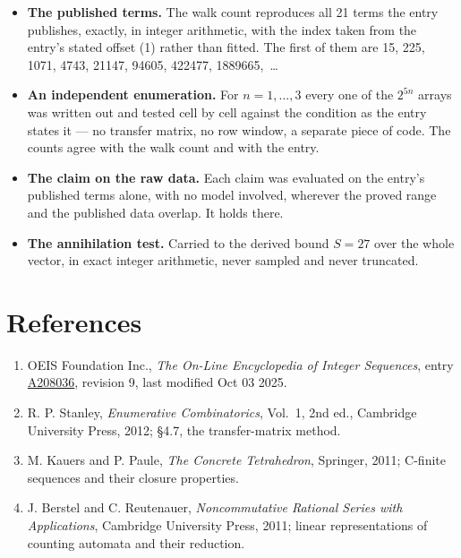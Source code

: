 \documentclass[11pt]{article}
\theoremstyle{definition}
\begin{document}
\begin{itemize}

\item {\bfseries The published terms.} The walk count reproduces all 21 terms the entry publishes, exactly, in integer arithmetic, with the index taken from the entry's stated offset (1) rather than fitted. The first of them are 15, 225, 1071, 4743, 21147, 94605, 422477, 1889665,~\dots

\item {\bfseries An independent enumeration.} For $n = 1,\dots,3$ every one of the $2^{5n}$ arrays was written out and tested cell by cell against the condition as the entry states it --- no transfer matrix, no row window, a separate piece of code. The counts agree with the walk count and with the entry.

\item {\bfseries The claim on the raw data.} Each claim was evaluated on the entry's published terms alone, with no model involved, wherever the proved range and the published data overlap. It holds there.

\item {\bfseries The annihilation test.} Carried to the derived bound $S = 27$ over the whole vector, in exact integer arithmetic, never sampled and never truncated.

\end{itemize}

\section{References}

\begin{enumerate}

\item OEIS Foundation Inc., \emph{The On-Line Encyclopedia of Integer Sequences}, entry \href{https://oeis.org/A208036}{A208036}, revision 9, last modified Oct 03 2025.

\item R. P. Stanley, \emph{Enumerative Combinatorics}, Vol.~1, 2nd ed., Cambridge University Press, 2012; \S4.7, the transfer-matrix method.

\item M. Kauers and P. Paule, \emph{The Concrete Tetrahedron}, Springer, 2011; C-finite sequences and their closure properties.

\item J. Berstel and C. Reutenauer, \emph{Noncommutative Rational Series with Applications}, Cambridge University Press, 2011; linear representations of counting automata and their reduction.

\end{enumerate}
\end{document}
